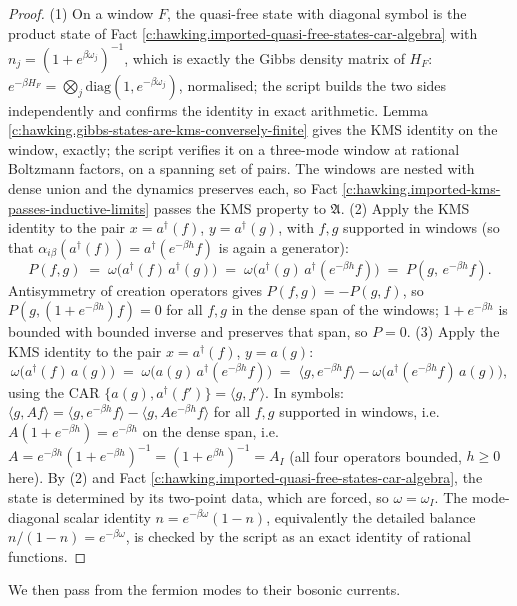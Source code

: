 \documentclass[11pt]{article}
\theoremstyle{definition}
\theoremstyle{plain}
\providecommand{\ip}{}\renewcommand{\ip}[2]{\langle #1, #2\rangle}
\begin{document}
\begin{proof}
(1) On a window $F$, the quasi-free state with diagonal symbol is the product state of Fact \ref{c:hawking.imported-quasi-free-states-car-algebra} with $n_j = (1 + e^{\beta\omega_j})^{-1}$, which is exactly the Gibbs density matrix of $H_F$: $e^{-\beta H_F} = \bigotimes_j \mathrm{diag}(1, e^{-\beta\omega_j})$, normalised; the script builds the two sides independently and confirms the identity in exact arithmetic. Lemma \ref{c:hawking.gibbs-states-are-kms-conversely-finite} gives the KMS identity on the window, exactly; the script verifies it on a three-mode window at rational Boltzmann factors, on a spanning set of pairs. The windows are nested with dense union and the dynamics preserves each, so Fact \ref{c:hawking.imported-kms-passes-inductive-limits} passes the KMS property to $\mathfrak{A}$.
(2) Apply the KMS identity to the pair $x = a^\dagger(f)$, $y = a^\dagger(g)$, with $f, g$ supported in windows (so that $\alpha_{i\beta}(a^\dagger(f)) = a^\dagger(e^{-\beta h}f)$ is again a generator):
\[
P(f, g) \;=\; \omega\bigl(a^\dagger(f)\,a^\dagger(g)\bigr) \;=\; \omega\bigl(a^\dagger(g)\,a^\dagger(e^{-\beta h}f)\bigr) \;=\; P(g,\, e^{-\beta h}f).
\]
Antisymmetry of creation operators gives $P(f, g) = -P(g, f)$, so $P(g, (1 + e^{-\beta h})f) = 0$ for all $f, g$ in the dense span of the windows; $1 + e^{-\beta h}$ is bounded with bounded inverse and preserves that span, so $P = 0$.
(3) Apply the KMS identity to the pair $x = a^\dagger(f)$, $y = a(g)$:
\[
\omega\bigl(a^\dagger(f)\,a(g)\bigr) \;=\; \omega\bigl(a(g)\,a^\dagger(e^{-\beta h}f)\bigr)
\;=\; \ip{g}{e^{-\beta h}f} - \omega\bigl(a^\dagger(e^{-\beta h}f)\,a(g)\bigr),
\]
using the CAR $\{a(g), a^\dagger(f')\} = \ip{g}{f'}$. In symbols: $\ip{g}{Af} = \ip{g}{e^{-\beta h}f} - \ip{g}{Ae^{-\beta h}f}$ for all $f, g$ supported in windows, i.e.\ $A(1 + e^{-\beta h}) = e^{-\beta h}$ on the dense span, i.e.\ $A = e^{-\beta h}(1+e^{-\beta h})^{-1} = (1 + e^{\beta h})^{-1} = A_I$ (all four operators bounded, $h \ge 0$ here). By (2) and Fact \ref{c:hawking.imported-quasi-free-states-car-algebra}, the state is determined by its two-point data, which are forced, so $\omega = \omega_I$. The mode-diagonal scalar identity $n = e^{-\beta\omega}(1-n)$, equivalently the detailed balance $n/(1-n) = e^{-\beta\omega}$, is checked by the script as an exact identity of rational functions.

\end{proof}

We then pass from the fermion modes to their bosonic currents.
\end{document}
